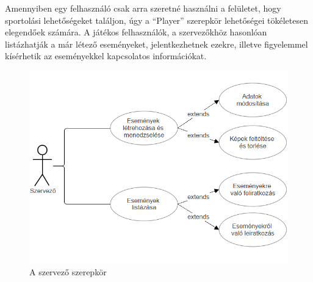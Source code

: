   Amennyiben egy felhasználó csak arra szeretné használni a felületet, hogy sportolási lehetőségeket találjon, úgy a ``Player'' szerepkör
  lehetőségei tökéletesen elegendőek számára. A játékos felhasználók, a szervezőkhöz hasonlóan listázhatják a már létező eseményeket, 
  jelentkezhetnek ezekre, illetve figyelemmel kísérhetik az eseményekkel kapcsolatos információkat.

\clearpage

  \begin{figure}[h]
    \centering
    \includegraphics[width=\textwidth]{./images/Screenshot 2024-04-13 021859.png}
    \caption{A szervező szerepkör}
    \label{fig:organizer_role}
  \end{figure}